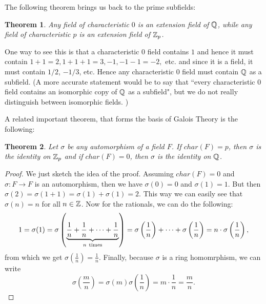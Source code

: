 \documentclass[12pt]{article}
\theoremstyle{plain}
\newtheorem{theorem}{Theorem}
\theoremstyle{definition}
\theoremstyle{remark}
\begin{document}
The following theorem brings us back to the prime subfields:
\begin{theorem}
Any field of characteristic $0$ is an extension field of $\mathbb{Q}$, while any field of characteristic $p$ is an extension field of $\mathbb{Z}_p$. 
\end{theorem}
One way to see this is that a characteristic $0$ field contains $1$ and hence it must contain $1+1=2, 1+1+1=3, -1, -1-1=-2,$ etc. and since it is a field, it must contain $1/2$, $-1/3$, etc. Hence any characteristic $0$ field must contain $\mathbb{Q}$ as a subfield. (A more accurate statement would be to say that ``every characteristic $0$ field contains an isomorphic copy of $\mathbb{Q}$ as a subfield", but we do not really distinguish between isomorphic fields. )

A related important theorem, that forms the basis of Galois Theory is the following:
\begin{theorem}
Let $\sigma$ be any automorphism of a field $F$. If $char(F)=p$, then $\sigma$ is the identity on $\mathbb{Z}_p$ and if $char(F)=0$, then $\sigma$ is the identity on $\mathbb{Q}$.
\end{theorem}
\begin{proof}
We just sketch the idea of the proof. Assuming $char(F)=0$ and $\sigma:F\rightarrow F$ is an automorphism, then we have 
$\sigma(0)=0$ and $\sigma(1)=1$. But then $\sigma(2)=\sigma(1+1)=\sigma(1)+\sigma(1)=2.$ This way we can easily see that $\sigma(n)=n$ for all $n\in \mathbb{Z}$. Now for the rationals, we can do the following:
$$1=\sigma(1) = \sigma\left (\underbrace{\frac{1}{n} +\frac{1}{n} +\cdots + \frac{1}{n}}_{n\rm\ times}\right ) = \sigma\left (\frac{1}{n}\right )+\cdots+\sigma \left (\frac{1}{n}\right ) = n\cdot\sigma\left (\frac{1}{n}\right ), $$
from which we get $\sigma\left (\frac{1}{n}\right ) = \frac{1}{n}$. Finally, because $\sigma$ is a ring homomrphism, we can write 
$$\sigma\left (\frac{m}{n}\right ) = \sigma(m)\sigma\left (\frac{1}{n}\right ) = m\cdot \frac{1}{n}=\frac{m}{n}. $$
\end{proof}
\end{document}

